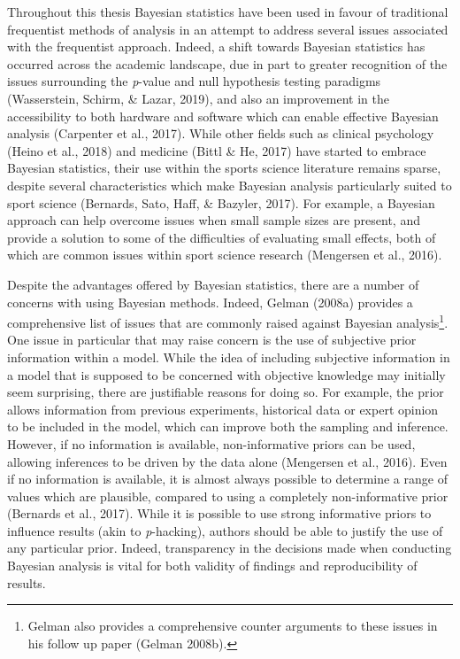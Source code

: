\documentclass[
  english,
  man,floatsintext]{apa6}
\begin{document}
Throughout this thesis Bayesian statistics have been used in favour of traditional frequentist methods of analysis in an attempt to address several issues associated with the frequentist approach.
Indeed, a shift towards Bayesian statistics has occurred across the academic landscape, due in part to greater recognition of the issues surrounding the \emph{p}-value and null hypothesis testing paradigms (Wasserstein, Schirm, \& Lazar, 2019), and also an improvement in the accessibility to both hardware and software which can enable effective Bayesian analysis (Carpenter et al., 2017).
While other fields such as clinical psychology (Heino et al., 2018) and medicine (Bittl \& He, 2017) have started to embrace Bayesian statistics, their use within the sports science literature remains sparse, despite several characteristics which make Bayesian analysis particularly suited to sport science (Bernards, Sato, Haff, \& Bazyler, 2017).
For example, a Bayesian approach can help overcome issues when small sample sizes are present, and provide a solution to some of the difficulties of evaluating small effects, both of which are common issues within sport science research (Mengersen et al., 2016).

Despite the advantages offered by Bayesian statistics, there are a number of concerns with using Bayesian methods.
Indeed, Gelman (2008a) provides a comprehensive list of issues that are commonly raised against Bayesian analysis\footnote{Gelman also provides a comprehensive counter arguments to these issues in his follow up paper (Gelman 2008b).}.
One issue in particular that may raise concern is the use of subjective prior information within a model.
While the idea of including subjective information in a model that is supposed to be concerned with objective knowledge may initially seem surprising, there are justifiable reasons for doing so.
For example, the prior allows information from previous experiments, historical data or expert opinion to be included in the model, which can improve both the sampling and inference.
However, if no information is available, non-informative priors can be used, allowing inferences to be driven by the data alone (Mengersen et al., 2016).
Even if no information is available, it is almost always possible to determine a range of values which are plausible, compared to using a completely non-informative prior (Bernards et al., 2017).
While it is possible to use strong informative priors to influence results (akin to \emph{p}-hacking), authors should be able to justify the use of any particular prior.
Indeed, transparency in the decisions made when conducting Bayesian analysis is vital for both validity of findings and reproducibility of results.
\end{document}
